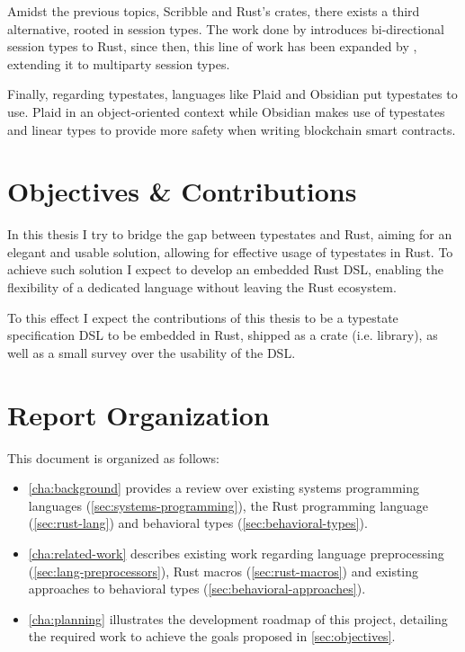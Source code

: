 Amidst the previous topics, Scribble and Rust's crates, there exists a third alternative, rooted in session types.
The work done by \autocite{Jespersen2015, Munksgaard2015} introduces bi-directional session types to Rust,
since then, this line of work has been expanded by \autocite{Lagaillardie2020},
extending it to multiparty session types.

Finally, regarding typestates, languages like Plaid \autocite{Aldrich2009} and Obsidian \autocite{Coblenz2020, Coblenz2020a}
put typestates to use. Plaid in an object-oriented context
while Obsidian makes use of typestates and linear types to provide more safety when writing blockchain smart contracts.

\section{Objectives \& Contributions}\label{sec:objectives}

In this thesis I try to bridge the gap between typestates and Rust,
aiming for an elegant and usable solution, allowing for effective usage of typestates in Rust.
To achieve such solution I expect to develop an embedded Rust DSL,
enabling the flexibility of a dedicated language without leaving the Rust ecosystem.

To this effect I expect the contributions of this thesis to be a typestate specification DSL to be embedded in Rust,
shipped as a crate (i.e. library), as well as a small survey over the usability of the DSL.


\section{Report Organization}\label{sec:organization}

This document is organized as follows:

\begin{itemize}
    \item \autoref{cha:background} provides a review over
    existing systems programming languages (\autoref{sec:systems-programming}),
    the Rust programming language (\autoref{sec:rust-lang}) and
    behavioral types (\autoref{sec:behavioral-types}).
    \item \autoref{cha:related-work} describes existing work regarding
    language preprocessing (\autoref{sec:lang-preprocessors}),
    Rust macros (\autoref{sec:rust-macros}) and
    existing approaches to behavioral types (\autoref{sec:behavioral-approaches}).
    \item \autoref{cha:planning} illustrates the development roadmap of this project,
    detailing the required work to achieve the goals proposed in \autoref{sec:objectives}.
\end{itemize}